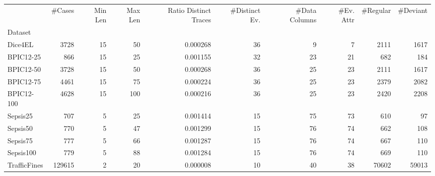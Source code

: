 \begin{tabular}{lrrrrrrrrr}
\toprule
 & \#Cases & Min Len & Max Len & Ratio Distinct Traces & \#Distinct Ev. & \#Data Columns & \#Ev. Attr & \#Regular & \#Deviant \\
Dataset &  &  &  &  &  &  &  &  &  \\
\midrule
Dice4EL & 3728 & 15 & 50 & 0.000268 & 36 & 9 & 7 & 2111 & 1617 \\
BPIC12-25 & 866 & 15 & 25 & 0.001155 & 32 & 23 & 21 & 682 & 184 \\
BPIC12-50 & 3728 & 15 & 50 & 0.000268 & 36 & 25 & 23 & 2111 & 1617 \\
BPIC12-75 & 4461 & 15 & 75 & 0.000224 & 36 & 25 & 23 & 2379 & 2082 \\
BPIC12-100 & 4628 & 15 & 100 & 0.000216 & 36 & 25 & 23 & 2420 & 2208 \\
Sepsis25 & 707 & 5 & 25 & 0.001414 & 15 & 75 & 73 & 610 & 97 \\
Sepsis50 & 770 & 5 & 47 & 0.001299 & 15 & 76 & 74 & 662 & 108 \\
Sepsis75 & 777 & 5 & 66 & 0.001287 & 15 & 76 & 74 & 667 & 110 \\
Sepsis100 & 779 & 5 & 88 & 0.001284 & 15 & 76 & 74 & 669 & 110 \\
TrafficFines & 129615 & 2 & 20 & 0.000008 & 10 & 40 & 38 & 70602 & 59013 \\
\bottomrule
\end{tabular}
